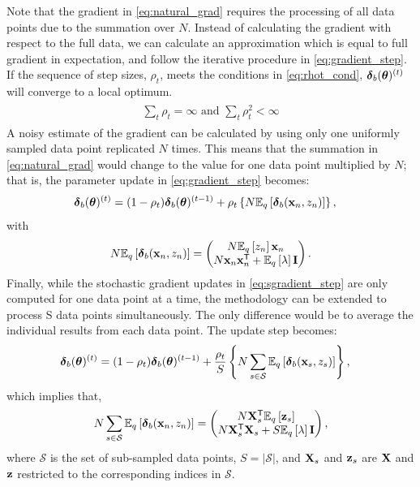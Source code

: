 \documentclass[]{article}
\newcommand{\Tra}{^{\sf T}} %
\newcommand{\V}[1]{{\bm{\mathbf{\MakeLowercase{#1}}}}} %
\def\I{{\bf I}}
\def\X{{\bf X}}
\def\x{{\bf x}}
\def\z{{\bf z}}
\def \vdelta{{\V{\delta}}}
\def \vtheta{{\V{\theta}}}
\newcommand{\Eq}{\mathbb{E}_{q}}
\begin{document}
Note that the gradient in \eqref{eq:natural_grad} requires the processing of all
data points due to the summation over $N$. Instead of calculating the gradient
with respect to the full data, we can calculate an approximation which is equal
to full gradient in expectation, and follow the iterative procedure in
\eqref{eq:gradient_step}. If the sequence of step sizes, $\rho_t$, meets the
conditions in \eqref{eq:rhot_cond}, $\vdelta_b(\vtheta)^{(t)}$ will converge to
a local optimum. 
\begin{align}
\label{eq:rhot_cond}
\begin{split}
\sum_t \rho_t = \infty \text{ and } \sum_t \rho_t^2 < \infty
\end{split}
\end{align}
A noisy estimate of the gradient can be calculated by using only one uniformly
sampled data point replicated $N$ times. This means that the summation in
\eqref{eq:natural_grad} would change to the value for one data point multiplied
by $N$; that is, the parameter update in \eqref{eq:gradient_step} becomes:
\begin{align}
\label{eq:sgradient_step}
\begin{split}
\vdelta_b(\vtheta)^{(t)} & = (1 - \rho_t) \vdelta_b(\vtheta)^{(t-1)} + 
\rho_t \left \{
N \Eq \left[ \vdelta_b(\x_n, z_n) \right]
\right \},
\end{split}
\end{align}
with 
\begin{align*}
N \Eq \left[ \vdelta_b(\x_n, z_n) \right] = 
\begin{pmatrix}
	N \Eq \left[ z_n \right] \x_n \\
	N \x_n \x_n\Tra + \Eq \left[ \lambda \right] \I
\end{pmatrix}.
\end{align*}
%
Finally, while the stochastic gradient updates in \eqref{eq:sgradient_step} are
only computed for one data point at a time, the methodology can be extended to
process S data points simultaneously. The only difference would be to average
the individual results from each data point. The update step becomes: 
\begin{align*}
\begin{split}
\vdelta_b(\vtheta)^{(t)} & = (1 - \rho_t) \vdelta_b(\vtheta)^{(t-1)} + 
\frac{\rho_t}{S} \left \{
N \sum_{s \in \mathcal{S}} \Eq \left[ \vdelta_b(\x_s, z_s) \right]
\right \},
\end{split}
\end{align*}
which implies that, 
\begin{align*}
N \sum_{s \in \mathcal{S}} \Eq \left[ \vdelta_b(\x_n, z_n) \right] = \begin{pmatrix}
	N \X_s\Tra \Eq \left[ \z_s \right] \\
	N \X_s\Tra \X_s + S \Eq \left[ \lambda \right] \I \\
\end{pmatrix},
\end{align*}
where $\mathcal{S}$ is the set of sub-sampled data points, $S = |\mathcal{S}|$,
and $\X_s$ and $\z_s$ are $\X$ and $\z$ restricted to the corresponding indices
in $\mathcal{S}$. 
\end{document}
